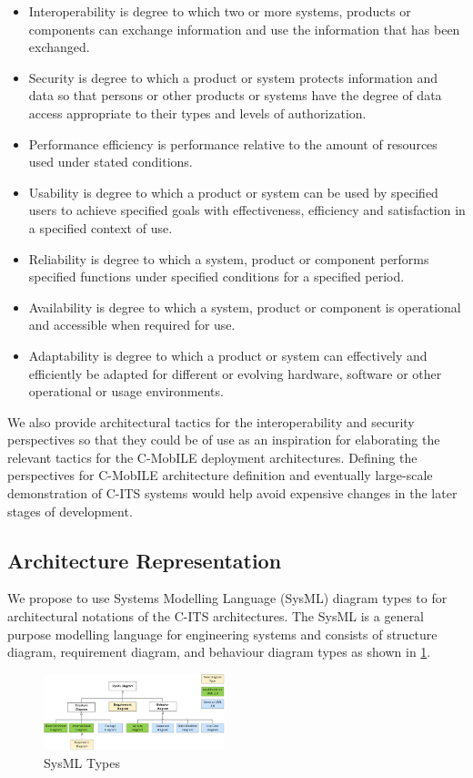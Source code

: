 \documentclass[letterpaper, 10 pt, conference]{ieeeconf}  %
\begin{document}
\begin{itemize}
	\item Interoperability is degree to which two or more systems, products or components can exchange information and use the information that has been exchanged.
	\item Security is degree to which a product or system protects information and data so that persons or other products or systems have the degree of data access appropriate to their types and levels of authorization.
	\item Performance efficiency is performance relative to the amount of resources used under stated conditions.
	\item Usability is degree to which a product or system can be used by specified users to achieve specified goals with effectiveness, efficiency and satisfaction in a specified context of use.
	\item Reliability is degree to which a system, product or component performs specified functions under specified conditions for a specified period.
	\item Availability is degree to which a system, product or component is operational and accessible when required for use.
	\item Adaptability is degree to which a product or system can effectively and efficiently be adapted for different or evolving hardware, software or other operational or usage environments.
\end{itemize}

We also provide architectural tactics for the interoperability and security perspectives so that they could be of use as an inspiration for elaborating the relevant tactics for the C-MobILE deployment architectures. Defining the perspectives for C-MobILE architecture definition and eventually large-scale demonstration of C-ITS systems would help avoid expensive changes in the later stages of development.

\subsection{Architecture Representation}
We propose to use Systems Modelling Language (SysML) diagram types to for architectural notations of the C-ITS architectures. The SysML is a general purpose modelling language for engineering systems and consists of structure diagram, requirement diagram, and behaviour diagram types as shown in \ref{sysml}.

\begin{figure}[ht!]
	\centering
	\includegraphics[width=0.47\textwidth]{sysml}
	\caption{SysML Types}
	\label{sysml}
	\centering
\end{figure}
\end{document}
